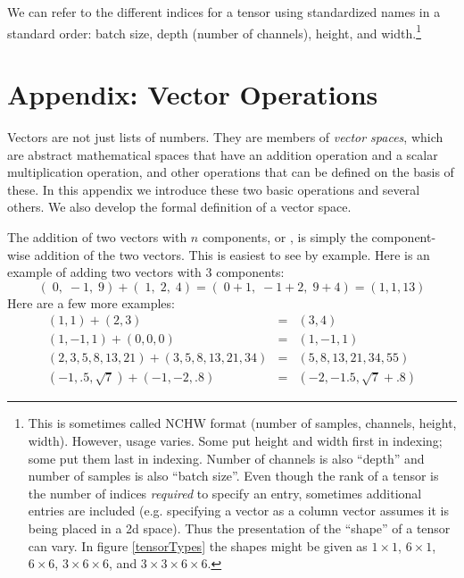 We can refer to the different indices for a tensor using standardized names in a standard order: batch size, depth (number of channels), height, and width.\footnote{This is sometimes called NCHW format (number of samples, channels, height, width). However, usage varies. Some put height and width first in indexing; some put them last in indexing. Number of channels is also ``depth'' and number of samples is also ``batch size''. Even though the rank of a tensor is the number of indices \emph{required} to specify an entry, sometimes additional entries are included (e.g. specifying a vector as a column vector assumes it is being placed in a 2d space). Thus the presentation of the ``shape'' of a tensor can vary.  In figure \ref{tensorTypes} the shapes might be given as $1 \times 1$, $6 \times 1$, $6 \times 6$, $3 \times 6 \times 6$, and $3 \times 3 \times 6 \times 6$.}

\section{Appendix: Vector Operations}\label{S:LinearAlgebraAppendix}


Vectors are not just lists of numbers. They are members of \emph{vector spaces}, which are abstract mathematical spaces that have an addition operation and a scalar multiplication operation, and other operations that can be defined on the basis of these. In this appendix we introduce these two basic operations and several others. We also develop the formal definition of a vector space.
   
   The addition of two vectors with $n$ components, or , is simply the component-wise addition of the two vectors. This is easiest to see by example. Here is an example of adding two vectors with 3 components:
\begin{equation*}
      (\; 0,\; -1,\; 9) + (\; 1,\; 2,\; 4) 
  = (\; 0+1,\; -1+2,\; 9+4) = (1, 1, 13)
\end{equation*}
Here are a few more examples:
\begin{eqnarray*}
(1,1) + (2,3) &=& (3,4)  \\
(1,-1,1) + (0,0,0) &=& (1,-1,1)  \\
(2,3,5,8,13,21) + (3,5,8,13,21,34) &=& (5,8,13,21,34,55) \\
(-1,.5,\sqrt{7}) + (-1,-2,.8) &=& (-2,-1.5,\sqrt{7}+.8)
\end{eqnarray*}

